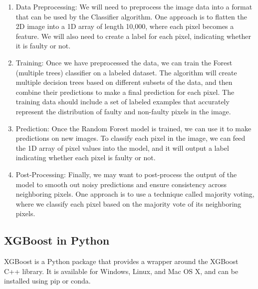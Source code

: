 \documentclass[12pt]{article}
\numberwithin{equation}{section}
\begin{document}
\begin{enumerate}
  \item Data Preprocessing: We will need to preprocess the image data into a format that can be used by the Classifier algorithm. One approach is to flatten the 2D image into a 1D array of length 10,000, where each pixel becomes a feature. We will also need to create a label for each pixel, indicating whether it is faulty or not.
  \item Training: Once we have preprocessed the data, we can train the Forest (multiple trees) classifier on a labeled dataset. The algorithm will create multiple decision trees based on different subsets of the data, and then combine their predictions to make a final prediction for each pixel. The training data should include a set of labeled examples that accurately represent the distribution of faulty and non-faulty pixels in the image.
  \item Prediction: Once the Random Forest model is trained, we can use it to make predictions on new images. To classify each pixel in the image, we can feed the 1D array of pixel values into the model, and it will output a label indicating whether each pixel is faulty or not.
  \item Post-Processing: Finally, we may want to post-process the output of the model to smooth out noisy predictions and ensure consistency across neighboring pixels. One approach is to use a technique called majority voting, where we classify each pixel based on the majority vote of its neighboring pixels.
\end{enumerate}

\subsection{XGBoost in Python}
XGBoost is a Python package that provides a wrapper around the XGBoost C++ library. It is available for Windows, Linux, and Mac OS X, and can be installed using pip or conda.
\end{document}
